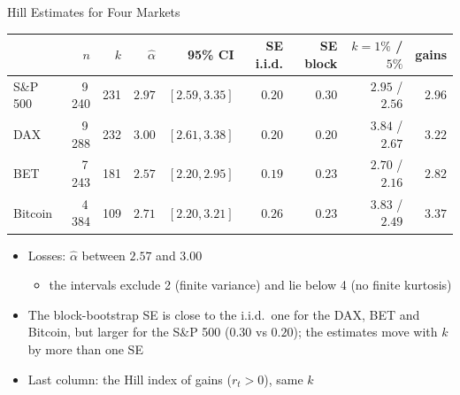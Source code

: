 \begin{frame}{Hill Estimates for Four Markets}
\itemsize{\footnotesize}
\begin{center}
\scriptsize
\begin{tabular}{lrrrrrrrr}
\toprule
& $n$ & $k$ & $\hat\alpha$ & 95\% CI & SE i.i.d. & SE block & $k = 1\%$ / $5\%$ & gains \\
\midrule
S\&P 500 & 9\,240 & 231 & $2.97$ & $[2.59, 3.35]$ & $0.20$ & $0.30$ & $2.95$ / $2.56$ & $2.96$ \\
DAX & 9\,288 & 232 & $3.00$ & $[2.61, 3.38]$ & $0.20$ & $0.20$ & $3.84$ / $2.67$ & $3.22$ \\
BET & 7\,243 & 181 & $2.57$ & $[2.20, 2.95]$ & $0.19$ & $0.23$ & $2.70$ / $2.16$ & $2.82$ \\
Bitcoin & 4\,384 & 109 & $2.71$ & $[2.20, 3.21]$ & $0.26$ & $0.23$ & $3.83$ / $2.49$ & $3.37$ \\
\bottomrule
\end{tabular}
\end{center}
\begin{itemize}
    \item Losses: $\hat\alpha$ between $2.57$ and $3.00$
    \begin{itemize}
        \item the intervals exclude 2 (finite variance) and lie below 4 (no finite kurtosis)
    \end{itemize}
    \item The block-bootstrap SE is close to the i.i.d.\ one for the DAX, BET and Bitcoin, but larger for the S\&P 500 ($0.30$ vs $0.20$); the estimates move with $k$ by more than one SE
    \item Last column: the Hill index of gains ($r_t > 0$), same $k$
\end{itemize}
\end{frame}

